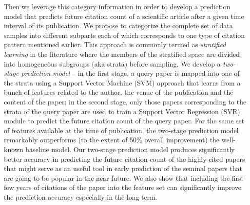 Then we leverage this category information in order to develop a prediction model that predicts future citation count of a scientific
article after a
given time interval of its publication.  We propose to categorize the complete set of data samples into different subparts each of which
corresponds to one type of citation pattern mentioned earlier. This approach is commonly termed as {\em stratified learning} in the
literature
where the members of the stratified space are divided into homogeneous subgroups (aka strata) before sampling. We develop a {\em two-stage
prediction model} -- in the first stage, a query paper is mapped into one of the strata using a
Support Vector Machine (SVM) approach that learns from a bunch of features related to the author, the venue of the publication and the
content
of the paper; in the second stage, only those papers corresponding to the strata of the query paper are used to train a Support Vector
Regression (SVR) module to predict the future citation count of the query paper. For the same set of features available at the time of
publication, the two-stage prediction model remarkably outperforms (to the extent of 50\% overall improvement) the well-known baseline
model. Our two-stage prediction model produces significantly better accuracy in predicting the future citation count of the highly-cited
papers that might serve as an useful tool in early prediction of the seminal papers that are going to be popular in the near future. 
We also show that including the first few years of citations of the paper into the feature set can significantly improve 
the prediction accuracy especially in the long term. 

